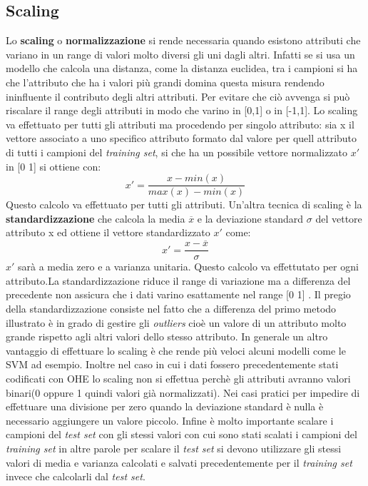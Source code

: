 \subsection{Scaling}
\label{subsub:scal}
Lo \textbf{scaling} o \textbf{normalizzazione} si rende necessaria quando esistono attributi che variano in un range di valori molto diversi gli uni dagli altri. Infatti se si usa un modello che calcola una distanza, come la distanza euclidea, tra i campioni si ha che l'attributo che ha i valori più grandi domina questa misura rendendo ininfluente il contributo degli altri attributi. Per evitare che ciò avvenga si può riscalare il range degli attributi in modo che varino in [0,1] o in [-1,1]. Lo scaling va effettuato per tutti gli attributi ma procedendo per singolo attributo: sia x il vettore associato a uno specifico attributo formato dal valore per quell attributo di tutti i campioni del \textit{training set}, si che ha un possibile vettore normalizzato $x'$ in [0 1] si ottiene con:
\begin{equation*}
x' = \frac{x - min(x)}{max(x) - min(x)}
\end{equation*}  
Questo calcolo va effettuato per tutti gli attributi.
Un'altra tecnica di scaling è la \textbf{standardizzazione} che  calcola la media $\overline{x}$ e la deviazione standard $\sigma$ del vettore attributo x ed ottiene il vettore standardizzato $x'$ come:
\begin{equation}
\label{eq:stand}
x' = \frac{x - \overline{x}}{\sigma}
\end{equation}  
$x'$ sarà a media zero e a varianza unitaria. Questo calcolo va effettutato per ogni attributo.La standardizzazione riduce il range di variazione ma a differenza del precedente non assicura che i dati varino esattamente nel range [0 1] . Il pregio della standardizzazione consiste nel fatto che a differenza del primo metodo illustrato è in grado di gestire gli \textit{outliers} cioè un valore di un attributo molto grande rispetto agli altri valori dello stesso attributo.
In generale un altro vantaggio di effettuare lo scaling è che rende più veloci alcuni modelli come le \ac{SVM} ad esempio. Inoltre nel caso in cui i dati fossero precedentemente stati codificati con \ac{OHE} lo scaling non si effettua perchè gli attributi avranno valori binari(0 oppure 1 quindi valori già normalizzati).
Nei casi pratici per impedire di effettuare una divisione per zero quando la deviazione standard è nulla è necessario aggiungere un valore piccolo. Infine è molto importante scalare i campioni del \textit{test set} con gli stessi valori con cui sono stati scalati i campioni del \textit{training set} in altre parole per scalare il \textit{test set} si devono utilizzare gli stessi valori di media e varianza calcolati e salvati precedentemente per il \textit{training set}  invece che calcolarli dal \textit{test set}. 

